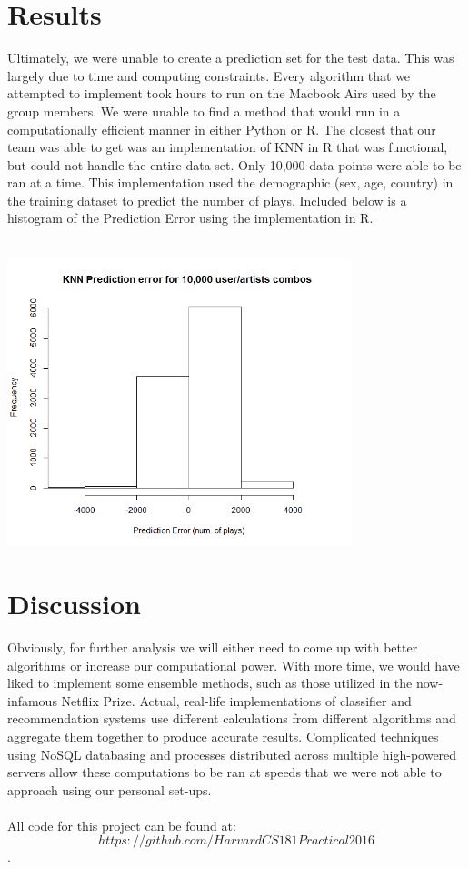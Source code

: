 \documentclass{article}
\begin{document}
\section{Results}
Ultimately, we were unable to create a prediction set for the test data. This was largely due to time and computing constraints. Every algorithm that we attempted to implement took hours to run on the Macbook Airs used by the group members. We were unable to find a method that would run in a computationally efficient manner in either Python or R. The closest that our team was able to get was an implementation of KNN in R that was functional, but could not handle the entire data set. Only 10,000 data points were able to be ran at a time. This implementation used the demographic (sex, age, country) in the training dataset to predict the number of plays.  Included below is a histogram of the Prediction Error using the implementation in R. \\\\ 
\begin{center}
\includegraphics[width=10cm]{pred_diff.png}
\end{center}
\section{Discussion}

Obviously, for further analysis we will either need to come up with better algorithms or increase our computational power. With more time, we would have liked to implement some ensemble methods, such as those utilized in the now-infamous Netflix Prize. Actual, real-life implementations of classifier and recommendation systems use different calculations from different algorithms and aggregate them together to produce accurate results. Complicated techniques using NoSQL databasing and processes distributed across multiple high-powered servers allow these computations to be ran at speeds that we were not able to approach using our personal set-ups.\\\\
All code for this project can be found at: $$https://github.com/HarvardCS181Practical2016$$.
\end{document}
